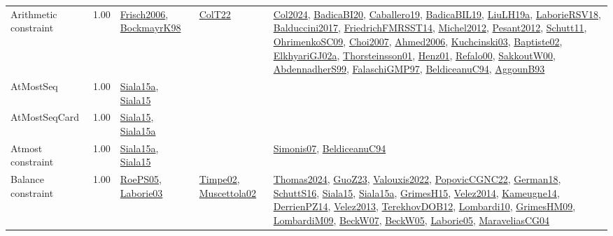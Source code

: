 {\begin{longtable}{p{3cm}r>{\raggedright\arraybackslash}p{6cm}>{\raggedright\arraybackslash}p{6cm}>{\raggedright\arraybackslash}p{8cm}}
\index{Arithmetic constraint}\index{Constraints!Arithmetic constraint}Arithmetic constraint &  1.00 & \hyperref[detail:Frisch2006]{Frisch2006}, \hyperref[detail:BockmayrK98]{BockmayrK98} & \hyperref[detail:ColT22]{ColT22} & \hyperref[detail:Col2024]{Col2024}, \hyperref[detail:BadicaBI20]{BadicaBI20}, \hyperref[detail:Caballero19]{Caballero19}, \hyperref[detail:BadicaBIL19]{BadicaBIL19}, \hyperref[detail:LiuLH19a]{LiuLH19a}, \hyperref[detail:LaborieRSV18]{LaborieRSV18}, \hyperref[detail:Balduccini2017]{Balduccini2017}, \hyperref[detail:FriedrichFMRSST14]{FriedrichFMRSST14}, \hyperref[detail:Michel2012]{Michel2012}, \hyperref[detail:Pesant2012]{Pesant2012}, \hyperref[detail:Schutt11]{Schutt11}, \hyperref[detail:OhrimenkoSC09]{OhrimenkoSC09}, \hyperref[detail:Choi2007]{Choi2007}, \hyperref[detail:Ahmed2006]{Ahmed2006}, \hyperref[detail:Kuchcinski03]{Kuchcinski03}, \hyperref[detail:Baptiste02]{Baptiste02}, \hyperref[detail:ElkhyariGJ02a]{ElkhyariGJ02a}, \hyperref[detail:Thorsteinsson01]{Thorsteinsson01}, \hyperref[detail:Henz01]{Henz01}, \hyperref[detail:Refalo00]{Refalo00}, \hyperref[detail:SakkoutW00]{SakkoutW00}, \hyperref[detail:AbdennadherS99]{AbdennadherS99}, \hyperref[detail:FalaschiGMP97]{FalaschiGMP97}, \hyperref[detail:BeldiceanuC94]{BeldiceanuC94}, \hyperref[detail:AggounB93]{AggounB93}\\
\index{AtMostSeq}\index{Constraints!AtMostSeq}AtMostSeq &  1.00 & \hyperref[detail:Siala15a]{Siala15a}, \hyperref[detail:Siala15]{Siala15} &  & \\
\index{AtMostSeqCard}\index{Constraints!AtMostSeqCard}AtMostSeqCard &  1.00 & \hyperref[detail:Siala15]{Siala15}, \hyperref[detail:Siala15a]{Siala15a} &  & \\
\index{Atmost constraint}\index{Constraints!Atmost constraint}Atmost constraint &  1.00 & \hyperref[detail:Siala15a]{Siala15a}, \hyperref[detail:Siala15]{Siala15} &  & \hyperref[detail:Simonis07]{Simonis07}, \hyperref[detail:BeldiceanuC94]{BeldiceanuC94}\\
\index{Balance constraint}\index{Constraints!Balance constraint}Balance constraint &  1.00 & \hyperref[detail:RoePS05]{RoePS05}, \hyperref[detail:Laborie03]{Laborie03} & \hyperref[detail:Timpe02]{Timpe02}, \hyperref[detail:Muscettola02]{Muscettola02} & \hyperref[detail:Thomas2024]{Thomas2024}, \hyperref[detail:GuoZ23]{GuoZ23}, \hyperref[detail:Valouxis2022]{Valouxis2022}, \hyperref[detail:PopovicCGNC22]{PopovicCGNC22}, \hyperref[detail:German18]{German18}, \hyperref[detail:SchuttS16]{SchuttS16}, \hyperref[detail:Siala15]{Siala15}, \hyperref[detail:Siala15a]{Siala15a}, \hyperref[detail:GrimesH15]{GrimesH15}, \hyperref[detail:Velez2014]{Velez2014}, \hyperref[detail:Kameugne14]{Kameugne14}, \hyperref[detail:DerrienPZ14]{DerrienPZ14}, \hyperref[detail:Velez2013]{Velez2013}, \hyperref[detail:TerekhovDOB12]{TerekhovDOB12}, \hyperref[detail:Lombardi10]{Lombardi10}, \hyperref[detail:GrimesHM09]{GrimesHM09}, \hyperref[detail:LombardiM09]{LombardiM09}, \hyperref[detail:BeckW07]{BeckW07}, \hyperref[detail:BeckW05]{BeckW05}, \hyperref[detail:Laborie05]{Laborie05}, \hyperref[detail:MaraveliasCG04]{MaraveliasCG04}\\

\end{longtable}}
